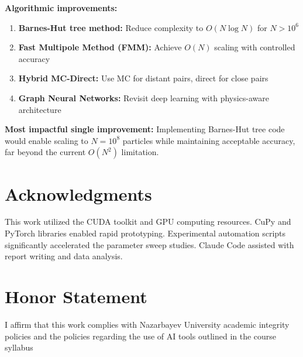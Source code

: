 \documentclass[11pt,a4paper]{article}
\newcommand{\honor}{I affirm that this work complies with Nazarbayev University academic integrity policies and the policies regarding the use of AI tools outlined in the course syllabus}
\begin{document}
\textbf{Algorithmic improvements:}
\begin{enumerate}
\item \textbf{Barnes-Hut tree method:} Reduce complexity to $O(N \log N)$ for $N > 10^6$
\item \textbf{Fast Multipole Method (FMM):} Achieve $O(N)$ scaling with controlled accuracy
\item \textbf{Hybrid MC-Direct:} Use MC for distant pairs, direct for close pairs
\item \textbf{Graph Neural Networks:} Revisit deep learning with physics-aware architecture
\end{enumerate}

\textbf{Most impactful single improvement:} Implementing Barnes-Hut tree code would enable scaling to $N=10^8$ particles while maintaining acceptable accuracy, far beyond the current $O(N^2)$ limitation.

\section*{Acknowledgments}

This work utilized the CUDA toolkit and GPU computing resources. CuPy and PyTorch libraries enabled rapid prototyping. Experimental automation scripts significantly accelerated the parameter sweep studies. Claude Code assisted with report writing and data analysis.

\section*{Honor Statement}
\honor

\printbibliography
\end{document}
